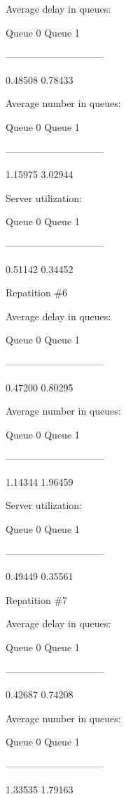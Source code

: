\documentclass{article}
\begin{document}
 Average delay in queues:
 
 Queue 0		Queue 1
 
 ------------------------------
 
 0.48508		0.78433
 


 Average number in queues:
 
 Queue 0		Queue 1
 
 ------------------------------
 
 1.15975		3.02944
 


 Server utilization:
 
 Queue 0		Queue 1
 
 ------------------------------
 
 0.51142		0.34452
 


 Repatition \#6



 Average delay in queues:
 
 Queue 0		Queue 1
 
 ------------------------------
 
 0.47200		0.80295
 


 Average number in queues:
 
 Queue 0		Queue 1
 
 ------------------------------
 
 1.14344		1.96459
 


 Server utilization:
 
 Queue 0		Queue 1
 
 ------------------------------
 
 0.49449		0.35561
 


 Repatition \#7
 



 Average delay in queues:
 
 Queue 0		Queue 1
 
 ------------------------------
 
 0.42687		0.74208
 


 Average number in queues:
 
 Queue 0		Queue 1
 
 ------------------------------
 
 1.33535		1.79163
 
\end{document}
